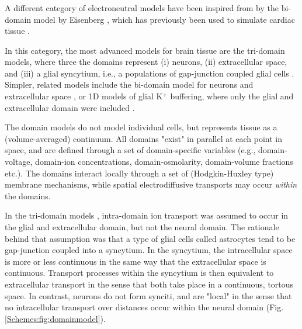 \subsubsection{}
\label{sec:Schemes:domain}
A different category of electroneutral models have been inspired from by the bi-domain model by Eisenberg \citep{eisenberg1970}, which has previously been used to simulate cardiac tissue \citep{henriquez1993, sundnes2006, Mori2008}. 

In this category, the most advanced models for brain tissue are the tri-domain models, where three the domains represent (i) neurons, (ii) extracellular space, and (iii) a glial syncytium, i.e., a populations of gap-junction coupled glial cells \citep{OConnell2016, tuttle2019}. Simpler, related models include the bi-domain model for neurons and extracellular space \citep{Mori2015}, or 1D models of glial K$^+$ buffering, where only the glial and extracellular domain were included \cite{Gardner-Medwin1983, Chen2000, Halnes2013}.

The domain models do not model individual cells, but represents tissue as a (volume-averaged) continuum. All domains "exist" in parallel at each point in space, and are defined through a set of domain-specific variables (e.g., domain-voltage, domain-ion concentrations, domain-osmolarity, domain-volume fractions etc.). The domains interact locally through a set of (Hodgkin-Huxley type) membrane mechanisms, while spatial electrodiffusive transports may occur \textit{within} the domains. 

In the tri-domain models \citep{OConnell2016, tuttle2019}, intra-domain ion transport was assumed to occur in the glial and extracellular domain, but not the neural domain. The rationale behind that assumption was that a type of glial cells called astrocytes tend to be gap-junction coupled into a syncytium. In the syncytium, the intracellular space is more or less continuous in the same way that the extracellular space is continuous. Transport processes within the syncytium is then equivalent to extracellular transport in the sense that both take place in a continuous, tortous space. In contrast, neurons do not form synciti, and are "local" in the sense that no intracellular transport over distances occur within the neural domain (Fig.\ref{Schemes:fig:domainmodel}). 

